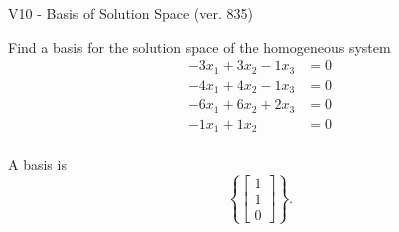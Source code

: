 \begin{exercise}
  \begin{exerciseTitle}V10 - Basis of Solution Space (ver. 835)\end{exerciseTitle}
  \begin{exerciseStatement}
    Find a basis for the solution space of the homogeneous system 
\begin{align*}
 -3 x_ 1 + 3 x_ 2 -1 x_ 3 &= 0  \\ 
  -4 x_ 1 + 4 x_ 2 -1 x_ 3 &= 0  \\ 
  -6 x_ 1 + 6 x_ 2 + 2 x_ 3 &= 0  \\ 
  -1 x_ 1 + 1 x_ 2 &= 0  \\ 
 \end{align*}


 
  \end{exerciseStatement}

  \begin{exerciseAnswer}
   A basis is   
\[\left\{\left[\begin{array}{c}
1 \\
1 \\
0
\end{array}\right]\right\}.\]

  


  \end{exerciseAnswer}
\end{exercise}